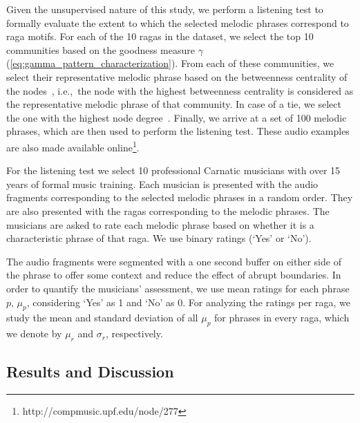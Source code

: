 {Given the unsupervised nature of this study, we perform a listening test to formally evaluate the extent to which the selected melodic phrases correspond to \gls{raga} motifs. For each of the 10 \glspl{raga} in the dataset, we select the top 10 communities based on the goodness measure $\gamma$ (\eqref{eq:gamma_pattern_characterization}). From each of these communities, we select their representative melodic phrase based on the betweenness centrality of the nodes~\citep{newman2003structure}, i.e.,~the node with the highest betweenness centrality is considered as the representative melodic phrase of that community. In case of a tie, we select the one with the highest node degree~\citep{newman2003structure}. Finally, we  arrive at a set of 100 melodic phrases, which are then used to perform the listening test. These audio examples are also made available online\footnote{http://compmusic.upf.edu/node/277}. 

For the listening test we select 10 professional Carnatic musicians with over 15 years of formal music training. Each musician is presented with the audio fragments corresponding to the selected melodic phrases in a random order. They are also presented with the \glspl{raga} corresponding to the melodic phrases. The musicians are asked to rate each melodic phrase based on whether it is a characteristic phrase of that \gls{raga}. We use binary ratings (`Yes' or `No'). 

The audio fragments were segmented with a one second buffer on either side of the phrase to offer some context and reduce the effect of abrupt boundaries. %
In order to quantify the musicians' assessment, we use mean ratings for each phrase $p$, $\mu_p$, considering `Yes' as 1 and `No' as 0. For analyzing the ratings per \gls{raga}, we study the mean and standard deviation of all $\mu_p$ for phrases in every \gls{raga}, which we denote by $\mu_r$ and $\sigma_r$, respectively.


\subsection{Results and Discussion}
\label{sec:patterns_characterization_results_and_discussion}

}
